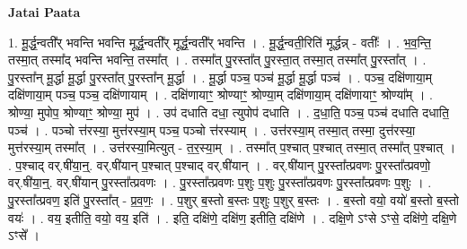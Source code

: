 \documentclass[17pt]{extarticle}
\begin{document}
\textbf{Jatai Paata} \newline

1. मू॒र्द्ध॒न्वती᳚र् भवन्ति भवन्ति मूर्द्ध॒न्वती᳚र् मूर्द्ध॒न्वती᳚र् भवन्ति । . मू॒र्द्ध॒न्वती॒रिति॑ मूर्द्धन्न् - वतीः᳚ । . भ॒व॒न्ति॒ तस्मा॒त् तस्मा᳚द् भवन्ति भवन्ति॒ तस्मा᳚त् । . तस्मा᳚त् पु॒रस्ता᳚त् पु॒रस्ता॒त् तस्मा॒त् तस्मा᳚त् पु॒रस्ता᳚त् । . पु॒रस्ता᳚न् मू॒र्द्धा मू॒र्द्धा पु॒रस्ता᳚त् पु॒रस्ता᳚न् मू॒र्द्धा । . मू॒र्द्धा पञ्च॒ पञ्च॑ मू॒र्द्धा मू॒र्द्धा पञ्च॑ । . पञ्च॒ दक्षि॑णाया॒म् दक्षि॑णाया॒म् पञ्च॒ पञ्च॒ दक्षि॑णायाम् । . दक्षि॑णायाꣳ॒॒ श्रोण्याꣳ॒॒ श्रोण्या॒म् दक्षि॑णाया॒म् दक्षि॑णायाꣳ॒॒ श्रोण्या᳚म् । . श्रोण्या॒ मुपोप॒ श्रोण्याꣳ॒॒ श्रोण्या॒ मुप॑ । . उप॑ दधाति दधा॒ त्युपोप॑ दधाति । . द॒धा॒ति॒ पञ्च॒ पञ्च॑ दधाति दधाति॒ पञ्च॑ । . पञ्चो त्त॑रस्या॒ मुत्त॑रस्या॒म् पञ्च॒ पञ्चो त्त॑रस्याम् । . उत्त॑रस्या॒म् तस्मा॒त् तस्मा॒ दुत्त॑रस्या॒ मुत्त॑रस्या॒म् तस्मा᳚त् । . उत्त॑रस्या॒मित्युत् - त॒र॒स्या॒म् । . तस्मा᳚त् प॒श्चात् प॒श्चात् तस्मा॒त् तस्मा᳚त् प॒श्चात् । . प॒श्चाद् वर्.षी॑या॒न्॒. वर्.षी॑यान् प॒श्चात् प॒श्चाद् वर्.षी॑यान् । . वर्.षी॑यान् पु॒रस्ता᳚त्प्रवणः पु॒रस्ता᳚त्प्रवणो॒ वर्.षी॑या॒न्॒. वर्.षी॑यान् पु॒रस्ता᳚त्प्रवणः । . पु॒रस्ता᳚त्प्रवणः प॒शुः प॒शुः पु॒रस्ता᳚त्प्रवणः पु॒रस्ता᳚त्प्रवणः प॒शुः । . पु॒रस्ता᳚त्प्रवण॒ इति॑ पु॒रस्ता᳚त् - प्र॒व॒णः॒ । . प॒शुर् ब॒स्तो ब॒स्तः प॒शुः प॒शुर् ब॒स्तः । . ब॒स्तो वयो॒ वयो॑ ब॒स्तो ब॒स्तो वयः॑ । . वय॒ इतीति॒ वयो॒ वय॒ इति॑ । . इति॒ दक्षि॑णे॒ दक्षि॑ण॒ इतीति॒ दक्षि॑णे । . दक्षि॒णे ऽꣳसे ऽꣳसे॒ दक्षि॑णे॒ दक्षि॒णे ऽꣳसे᳚ । \newline
\end{document}
